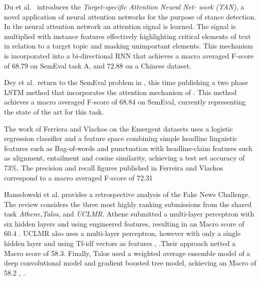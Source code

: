 \documentclass[Dissertation.tex]{subfiles}
\begin{document}
Du et al.\ \cite{duStanceClassificationTargetspecific} introduces the \textit{Target-specific Attention Neural Net-
work (TAN)}, a novel application of neural attention networks for the purpose of stance detection. In the neural attention network an attention signal is learned. The signal is multiplied with instance features effectively highlighting critical elements of text in relation to a target topic and masking unimportant elements. This mechanism is incorporated into a bi-directional RNN that achieves a macro averaged F-score of 68.79 on SemEval task A, and 72.88 on a Chinese dataset.

Dey et al.\ return to the SemEval problem in \cite{deyTopicalStanceDetection2018}, this time publishing a two phase LSTM method that incorporates the attention mechanism of \cite{duStanceClassificationTargetspecific}. This method achieves a macro averaged F-score of 68.84 on SemEval, currently representing the state of the art for this task.

The work of Ferriera and Vlachos \cite{ferreiraEmergentNovelDataset2016} on the Emergent datasets uses a logistic regression classifier and a feature space combining simple headline linguistic features such as Bag-of-words and punctuation with headline-claim features such as alignment, entailment and cosine similarity, achieving a test set accuracy of 73\%. The precision and recall figures published in Ferreira and Vlachos correspond to a macro averaged F-score of 72.31

Hanselowski et al. \cite{hanselowskiRetrospectiveAnalysisFake2018} provides a retrospective analysis of the Fake News Challenge. The review considers the three most highly ranking submissions from the shared task \textit{Athene},\textit{Talos},  and \textit{UCLMR}. Athene submitted a multi-layer perceptron with six hidden layers and using engineered features, resulting in an \f{Macro} score of 60.4 \cite{hanselowskiRetrospectiveAnalysisFake2018}. UCLMR also uses a multi-layer perceptron, however with only a single hidden layer and using Tf-idf vectors as features \cite{riedelSimpleToughtobeatBaseline2017}, \cite{hanselowskiRetrospectiveAnalysisFake2018}.Their approach netted a \f{Macro} score of 58.3. Finally, Talos used a weighted average ensemble model of a deep convolutional model and gradient boosted tree model, achieving an \f{Macro} of 58.2 \cite{largentTalosTargetsDisinformation}, \cite{hanselowskiRetrospectiveAnalysisFake2018}. 
\end{document}
